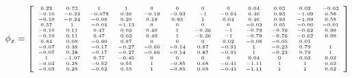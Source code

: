 \documentclass[11pt,a4paper,titlepage]{report}
\begin{document}
\begin{equation}
    \phi_x=
    \left[
    \begin{tiny}
    \begin{array}{*{12}c}
   0.22 & 0.73 & 1 & 1 & 0 & 0 & 0 & 0 & 0.04 & 0.03 & 0.02 & -0.03\\
   -0.10 & -0.24 & -0.078 & 0.26 & -0.19 & -0.93 & -1 & -0.64 & 0.46 & 0.93 & -1.09 & 0.58\\
   -0.10 & -0.24 & -0.08 & 0.26 & 0.19 & 0.93 & 1 & 0.64 & 0.46 & 0.93 & -1.09 & 0.58\\
   0.57 & 1 & -0.04 & -1.13 & 0 & 0 & 0 & 0 & -0.03 & 0.05 & -0.06 & -0.01\\ 
   -0.10 & 0.11 & 0.47 & 0.03 & 0.40 & 1 & -0.36 & -1 & -0.79 & -0.76 & -0.62 & 0.99\\
   -0.10 & 0.11 & 0.47 & 0.03 & 0.40 & 1 & -0.36 & -1 & -0.79 & -0.76 & -0.62 & 0.99\\
    0.84 & 0.08 & -0.90 & 0.87 & 0 & 0 & 0 & 0.02 & -0.08 & -0.05 & 0.01\\
    -0.07 & 0.38 & -0.17 & -0.27 & -0.66 & -0.14 & 0.87 & -0.91 & 1 & -0.23 & 0.79 & 1\\
    -0.07 & 0.38 & -0.17 & -0.27 & -0.66 & -0.14 & 0.87 & -0.91 & 1 & -0.23 & 0.79 & 1\\
     1 & -1.07 & 0.77 & -0.45 & 0 & 0 & 0 & 0 & 0.04 & 0 & 0.03 & 0.03\\
     -0.03 & 0.28 & -0.52 & 0.55 & 1 & -0.85 & 0.68 & -0.41 & -1.11 & 1 & 1 & 0.62\\
     -0.03 & 0.28 & -0.52 & 0.55 & 1 & -0.85 & 0.68 & -0.41 & -1.11 & 1 & 1 & 0.62\\
    \end{array}
    \end{tiny}
    \right]
    \label{eq:I.1 - phi x}
\end{equation}
\end{document}
